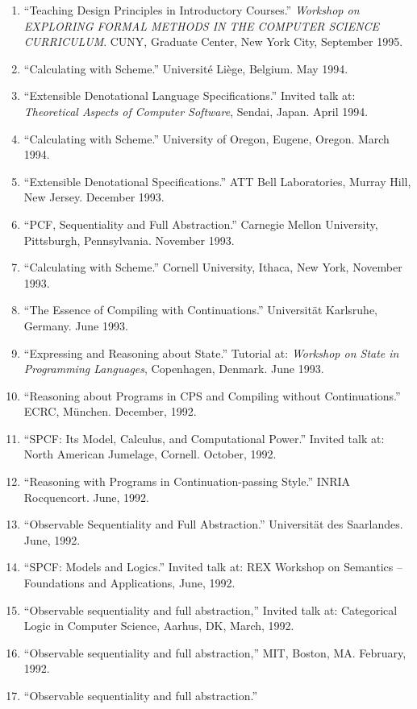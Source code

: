 \begin{enumerate}
\item{}``Teaching Design Principles in Introductory Courses.''
{\it Workshop on EXPLORING FORMAL METHODS IN THE COMPUTER SCIENCE
CURRICULUM\/}. CUNY, Graduate Center, New York  City, September 1995. 
\item{}``Calculating with Scheme.''
Universit\'{e} Li{\`e}ge, Belgium. May 1994. 
\item{}``Extensible Denotational Language Specifications.''
Invited talk at: {\it Theoretical Aspects of Computer Software\/},
Sendai, Japan.  April 1994. 
\item{}``Calculating with Scheme.''
University of Oregon, Eugene, Oregon. March 1994. 
\item ``Extensible Denotational Specifications.''
ATT Bell Laboratories, Murray Hill, New Jersey. December 1993.
\item ``PCF, Sequentiality and Full Abstraction.''
Carnegie Mellon University, Pittsburgh, Pennsylvania. November 1993. 
\item ``Calculating with Scheme.''
Cornell University, Ithaca, New York, November 1993. 
\item ``The Essence of Compiling with Continuations.''
Universit{\"a}t Karlsruhe, Germany. June 1993.
\item ``Expressing and Reasoning about State.''
Tutorial at: {\it Workshop on State in Programming Languages\/},
Copenhagen, Denmark. June 1993.
\item ``Reasoning about Programs in CPS and Compiling without Continuations.''
ECRC, M\"unchen. December, 1992.
\item ``SPCF: Its Model, Calculus, and Computational Power.''
Invited talk at: North American Jumelage, Cornell. October, 1992.
\item ``Reasoning with Programs in Continuation-passing Style.''
INRIA Rocquencort. June, 1992. 
\item ``Observable Sequentiality and Full Abstraction.''
Universit\"at des Saarlandes. June, 1992.
\item ``SPCF: Models and Logics.''
Invited talk at: REX Workshop on Semantics -- Foundations and
Applications, June, 1992.
\item ``Observable sequentiality and full abstraction,''
Invited talk at: Categorical Logic in Computer Science, Aarhus, DK,
March, 1992. 
\item ``Observable sequentiality and full abstraction,'' 
MIT, Boston, MA. February, 1992.
\item ``Observable sequentiality and full abstraction.''

\end{enumerate}
